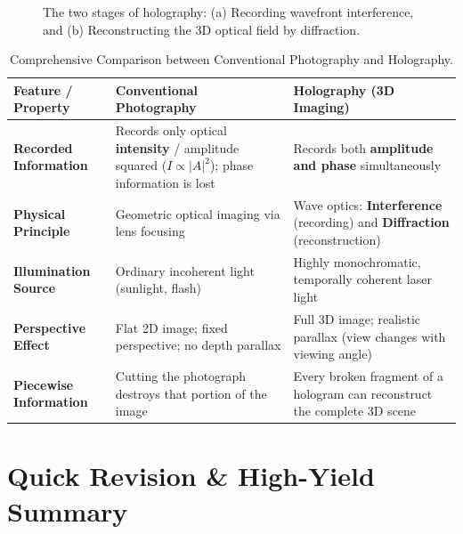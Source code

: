\begin{figure}[htbp]
\caption{The two stages of holography: (a) Recording wavefront interference, and (b) Reconstructing the 3D optical field by diffraction.}
\label{fig:holography}
\end{figure}

\begin{table}[htbp]
\centering
\small
\renewcommand{\arraystretch}{1.3}
\begin{tabularx}{\linewidth}{lXX}
\toprule
\textbf{Feature / Property} & \textbf{Conventional Photography} & \textbf{Holography (3D Imaging)} \\
\midrule
\textbf{Recorded Information} & Records only optical \textbf{intensity} / amplitude squared ($I \propto |A|^2$); phase information is lost & Records both \textbf{amplitude and phase} simultaneously \\
\textbf{Physical Principle} & Geometric optical imaging via lens focusing & Wave optics: \textbf{Interference} (recording) and \textbf{Diffraction} (reconstruction) \\
\textbf{Illumination Source} & Ordinary incoherent light (sunlight, flash) & Highly monochromatic, temporally coherent laser light \\
\textbf{Perspective Effect} & Flat 2D image; fixed perspective; no depth parallax & Full 3D image; realistic parallax (view changes with viewing angle) \\
\textbf{Piecewise Information} & Cutting the photograph destroys that portion of the image & Every broken fragment of a hologram can reconstruct the complete 3D scene \\
\bottomrule
\end{tabularx}
\caption{Comprehensive Comparison between Conventional Photography and Holography.}
\label{tab:photography-vs-holography}
\end{table}

\section{Quick Revision \& High-Yield Summary}


